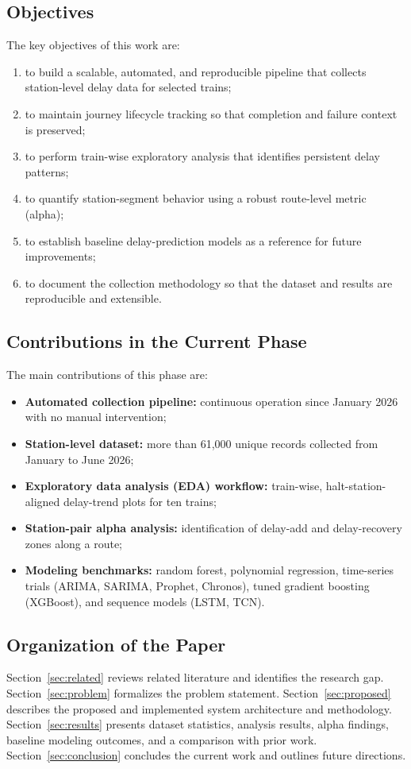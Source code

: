 \documentclass[conference]{IEEEtran}
\begin{document}
\subsection{Objectives}
The key objectives of this work are:
\begin{enumerate}
    \item to build a scalable, automated, and reproducible pipeline that collects station-level delay data for selected trains;
    \item to maintain journey lifecycle tracking so that completion and failure context is preserved;
    \item to perform train-wise exploratory analysis that identifies persistent delay patterns;
    \item to quantify station-segment behavior using a robust route-level metric (alpha);
    \item to establish baseline delay-prediction models as a reference for future improvements;
    \item to document the collection methodology so that the dataset and results are reproducible and extensible.
\end{enumerate}

\subsection{Contributions in the Current Phase}
The main contributions of this phase are:
\begin{itemize}
    \item \textbf{Automated collection pipeline:} continuous operation since January 2026 with no manual intervention;
    \item \textbf{Station-level dataset:} more than 61{,}000 unique records collected from January to June 2026;
    \item \textbf{Exploratory data analysis (EDA) workflow:} train-wise, halt-station-aligned delay-trend plots for ten trains;
    \item \textbf{Station-pair alpha analysis:} identification of delay-add and delay-recovery zones along a route;
    \item \textbf{Modeling benchmarks:} random forest, polynomial regression, time-series trials (ARIMA, SARIMA, Prophet, Chronos), tuned gradient boosting (XGBoost), and sequence models (LSTM, TCN).
\end{itemize}

\subsection{Organization of the Paper}
Section~\ref{sec:related} reviews related literature and identifies the research gap. Section~\ref{sec:problem} formalizes the problem statement. Section~\ref{sec:proposed} describes the proposed and implemented system architecture and methodology. Section~\ref{sec:results} presents dataset statistics, analysis results, alpha findings, baseline modeling outcomes, and a comparison with prior work. Section~\ref{sec:conclusion} concludes the current work and outlines future directions.
\end{document}
